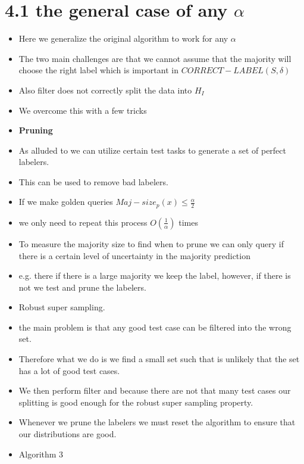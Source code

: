 \documentclass[11pt]{article}
\begin{document}
\section{4.1 the general case of any \(\alpha\)}
\label{sec:orgac68ba4}
\begin{itemize}
\item Here we generalize the original algorithm to work for any \(\alpha\)
\item The two main challenges are that we cannot assume that the majority will choose the right label which is important in \(CORRECT-LABEL(S,\delta)\)
\item Also filter does not correctly split the data into \(H_I\)
\item We overcome this with a few tricks
\item \textbf{Pruning}
\item As alluded to we can utilize certain test tasks to generate a set of perfect labelers.
\item This can be used to remove bad labelers.
\item If we make golden queries \(Maj-size_p(x) \leq \frac{\alpha}{2}\)
\item we only need to repeat this process \(O(\frac{1}{\alpha})\) times
\item To measure the majority size to find when to prune we can only query if there is a certain level of uncertainty in the majority prediction
\item e.g. there if there is a large majority we keep the label, however, if there is not we test and prune the labelers.
\item Robust super sampling.
\item the main problem is that any good test case can be filtered into the wrong set.
\item Therefore what we do is we find a small set such that is unlikely that the set has a lot of good test cases.
\item We then perform filter and because there are not that many test cases our splitting is good enough for the robust super sampling property.
\item Whenever we prune the labelers we must reset the algorithm to ensure that our distributions are good.
\item Algorithm 3
\end{itemize}
\end{document}
